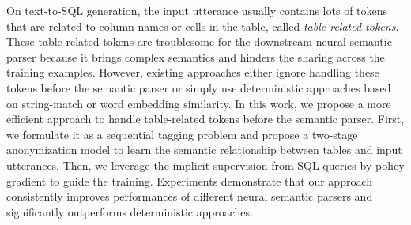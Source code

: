 On text-to-SQL generation, the input utterance usually contains lots of tokens that are related to column names or cells in the table, called \emph{table-related tokens}. These table-related tokens are troublesome for the downstream neural semantic parser because it brings complex semantics and hinders the sharing across the training examples. However, existing approaches either ignore handling these tokens before the semantic parser or simply use deterministic approaches based on string-match or word embedding similarity. In this work, we propose a more efficient approach to handle table-related tokens before the semantic parser. First, we formulate it as a sequential tagging problem and propose a two-stage anonymization model to learn the semantic relationship between tables and input utterances. Then, we leverage the implicit supervision from SQL queries by policy gradient to guide the training. Experiments demonstrate that our approach consistently improves performances of different neural semantic parsers and significantly outperforms deterministic approaches.